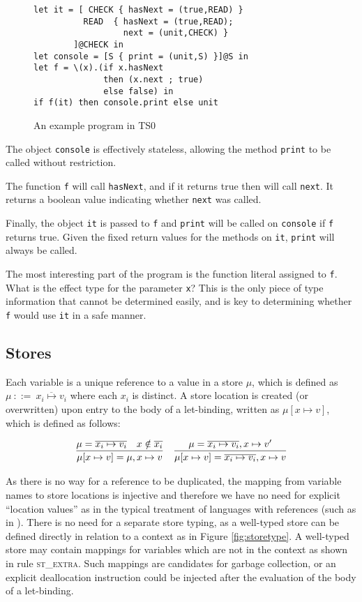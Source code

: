 \documentclass[preprint]{sigplanconf}
\newcommand{\figref}[1]{Figure \ref{#1}}
\begin{document}
\begin{figure}
\begin{lstlisting}
let it = [ CHECK { hasNext = (true,READ) } 
          READ  { hasNext = (true,READ);
                  next = (unit,CHECK) }
        ]@CHECK in
let console = [S { print = (unit,S) }]@S in
let f = \(x).(if x.hasNext 
              then (x.next ; true) 
              else false) in
if f(it) then console.print else unit
\end{lstlisting}
\caption{\label{fig:exampleprog} An example program in TS0}
\end{figure}

The object {\tt console} is effectively stateless, allowing the method
{\tt print} to be called without restriction.

The function {\tt f} will call {\tt hasNext}, and if it returns true then
will call {\tt next}. It returns a boolean value indicating whether
{\tt next} was called.

Finally, the object {\tt it} is passed to {\tt f} and {\tt print} will
be called on {\tt console} if {\tt f} returns true. Given the fixed return
values for the methods on {\tt it}, {\tt print} will always be called.

The most interesting part of the program is the function literal assigned
to {\tt f}. What is the effect type for the parameter {\tt x}? 
This is the only piece of type information that cannot be determined
easily, and is key to determining whether {\tt f} would use {\tt it} in
a safe manner.

\subsection{Stores}

Each variable is a unique reference to a value in a store $\mu$, which is 
defined as $\mu\:\mathrm{::=}\:\overline{x_i \mapsto v_i}$ where each $x_i$ is
distinct. A store location
is created (or overwritten) upon entry to the body of a let-binding, written as
$\mu[x \mapsto v]$, which is defined as follows:

\[
\begin{tabular}{cc}
\infer
{\mu[x \mapsto v] = \mu, x \mapsto v}
{\mu = \overline{x_i \mapsto v_i} & x \notin \overline{x_i}}
&
\infer
{\mu[x \mapsto v] = \overline{x_i \mapsto v_i} , x \mapsto v}
{\mu = \overline{x_i \mapsto v_i}, x \mapsto v'}
\end{tabular}
\]

As there is no way for a reference to be duplicated, the mapping
from variable names to store locations is injective and therefore we have
no need for explicit ``location values'' as in the typical treatment of 
languages with references (such as in \cite{Pierce2002}). There is no need
for a separate store typing, as a well-typed store can be defined directly
in relation to a context as in \figref{fig:storetype}. A well-typed store
may contain mappings for variables which are not in the context as shown in
rule \textsc{st\_extra}. Such mappings are candidates for garbage collection,
or an explicit deallocation instruction could be injected after the
evaluation of the body of a let-binding.
\end{document}
